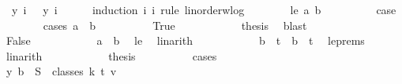 \begin{isabellebody}
\ {\isachardoublequoteopen}{\isasymchi}\ {\isacharparenleft}{\kern0pt}y\ i{}{\isacharparenright}{\kern0pt}\ {\isacharequal}{\kern0pt}\ {\isasymchi}\ {\isacharparenleft}{\kern0pt}y\ i{}{\isacharparenright}{\kern0pt}{\isachardoublequoteclose}\isanewline
\ \ \ \ \isamarkupfalse%
\ {\isacharparenleft}{\kern0pt}induction\ i{}\ i{}\ rule{\isacharcolon}{\kern0pt}\ linorder{\isacharunderscore}{\kern0pt}wlog{\isacharparenright}{\kern0pt}\isanewline
\ \ \ \ \ \ \isamarkupfalse%
\ {\isacharparenleft}{\kern0pt}le\ a\ b{\isacharparenright}{\kern0pt}\isanewline
\ \ \ \ \ \ \isamarkupfalse%
\ \isamarkupfalse%
\ {\isacharquery}{\kern0pt}case\isanewline
\ \ \ \ \ \ \isamarkupfalse%
\ {\isacharparenleft}{\kern0pt}cases\ {\isachardoublequoteopen}a\ {\isacharequal}{\kern0pt}\ b{\isachardoublequoteclose}{\isacharparenright}{\kern0pt}\isanewline
\ \ \ \ \ \ \ \ \isamarkupfalse%
\ True\isanewline
\ \ \ \ \ \ \ \ \isamarkupfalse%
\ \isamarkupfalse%
\ {\isacharquery}{\kern0pt}thesis\ \isamarkupfalse%
\ blast\isanewline
\ \ \ \ \ \ \isamarkupfalse%
\isanewline
\ \ \ \ \ \ \ \ \isamarkupfalse%
\ False\isanewline
\ \ \ \ \ \ \ \ \isamarkupfalse%
\ \isamarkupfalse%
\ {\isachardoublequoteopen}a\ {\isacharless}{\kern0pt}\ b{\isachardoublequoteclose}\ \isamarkupfalse%
\ le\ \isamarkupfalse%
\ linarith\isanewline
\ \ \ \ \ \ \ \ \isamarkupfalse%
\ \isamarkupfalse%
\ {\isachardoublequoteopen}b\ {\isacharequal}{\kern0pt}\ t{\isachardoublequoteclose}\ {\isacharbar}{\kern0pt}\ {\isachardoublequoteopen}b\ {\isacharless}{\kern0pt}\ t{\isachardoublequoteclose}\ \isamarkupfalse%
\ le{\isachardot}{\kern0pt}prems{\isacharparenleft}{\kern0pt}{}{\isacharparenright}{\kern0pt}\ \isamarkupfalse%
\ linarith\isanewline
\ \ \ \ \ \ \ \ \isamarkupfalse%
\ \isamarkupfalse%
\ {\isacharquery}{\kern0pt}thesis\isanewline
\ \ \ \ \ \ \ \ \isamarkupfalse%
\ cases\isanewline
\ \ \ \ \ \ \ \ \ \ \isamarkupfalse%
\ {}\isanewline
\ \ \ \ \ \ \ \ \ \ \isamarkupfalse%
\ \isamarkupfalse%
\ {\isachardoublequoteopen}y\ b\ {\isasymin}\ S\ {\isacharbackquote}{\kern0pt}\ classes\ k\ t\ v{\isachardoublequoteclose}\ \isanewline
\ \ \ \ \ \ \ \ \ \ \isamarkupfalse%

\end{isabellebody}
